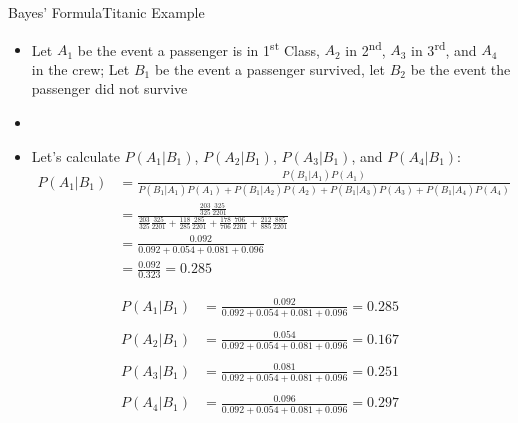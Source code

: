 \documentclass[xcolor=dvipsnames]{beamer}
\begin{document}
\begin{frame}{Bayes' Formula}{Titanic Example}
	\begin{itemize}
		\item Let $A_1$ be the event a passenger is in 1\textsuperscript{st} Class, $A_2$ in 2\textsuperscript{nd}, $A_3$ in 3\textsuperscript{rd}, and $A_4$ in the crew; Let $B_1$ be the event a passenger survived, let $B_2$ be the event the passenger did not survive
		\item[]
		\item Let's calculate $P(A_1|B_1)$, $P(A_2|B_1)$, $P(A_3|B_1)$, and $P(A_4|B_1)$:
		{\scriptsize
		\begin{align*}
			P(A_1|B_1) &= \frac{P(B_1|A_1)P(A_1)}{P(B_1|A_1)P(A_1) + P(B_1|A_2)P(A_2) + P(B_1|A_3)P(A_3) + P(B_1|A_4)P(A_4)} \\
			&= \frac{\frac{203}{325}\frac{325}{2201}}{\frac{203}{325}\frac{325}{2201} + \frac{118}{285}\frac{285}{2201} + \frac{178}{706}\frac{706}{2201} + \frac{212}{885}\frac{885}{2201}} \\
			&= \frac{0.092}{0.092 + 0.054 + 0.081 + 0.096} \\
			&= \frac{0.092}{0.323} = 0.285
		\end{align*}}
	\end{itemize}
\end{frame}

\begin{frame}
	\begin{align*}
		P(A_1|B_1) &= \frac{0.092}{0.092 + 0.054 + 0.081 + 0.096} = 0.285 \\ \\
		P(A_2|B_1) &= \frac{0.054}{0.092 + 0.054 + 0.081 + 0.096} = 0.167\\ \\
		P(A_3|B_1) &= \frac{0.081}{0.092 + 0.054 + 0.081 + 0.096} = 0.251\\ \\
		P(A_4|B_1) &= \frac{0.096}{0.092 + 0.054 + 0.081 + 0.096} = 0.297\\
	\end{align*}
\end{frame}
\end{document}
